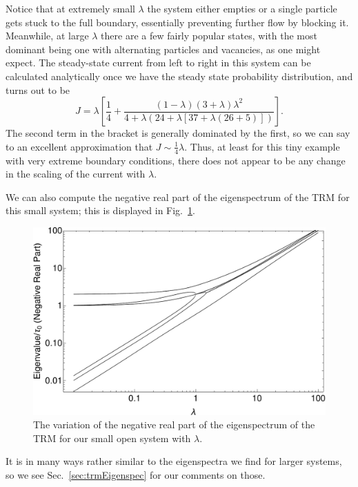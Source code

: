Notice that at extremely small $\lambda$ the system either empties or a single particle gets stuck to
the full boundary, 
essentially preventing further flow by blocking it. Meanwhile, at large $\lambda$ there are
a few fairly popular states, with the most dominant being one with alternating particles and 
vacancies, as one might expect. The steady-state current from left to right in this system can be
calculated analytically once we have the steady state probability distribution, and turns out to be
\begin{equation}
 J = \lambda \left[ \frac{1}{4} + \frac{(1-\lambda)(3+\lambda)\lambda^2}{4+
 \lambda\left(24+\lambda\left[37+\lambda\left(26+5\right)\right]\right)}  \right].
\end{equation}
The second term in the bracket is generally dominated by the first, so we can say to an excellent
approximation that $J \sim \frac{1}{4} \lambda$. Thus, at least for this tiny example with very
extreme boundary conditions, there does not appear to be any change in the scaling of the current
with $\lambda$.

We can also compute the negative real part of the eigenspectrum of the TRM for this small system;
this is displayed in Fig.~\ref{fig:smallEigSpec}.
 \begin{figure}[h!]
 \caption[The variation of the eigenspectrum of the TRM with $\lambda$ for a small open system.]{\label{fig:smallEigSpec} 
 The variation of the negative real part of the eigenspectrum of the TRM for our small open system
 with $\lambda$.
 }
  \begin{center}
 \includegraphics[width=1.0\textwidth]{TRM/images/smallOpenEigSpec}
  \end{center}
\end{figure}
It is in many ways rather similar to the eigenspectra we find for larger systems, so we see Sec.~\ref{sec:trmEigenspec} for our comments on those.

